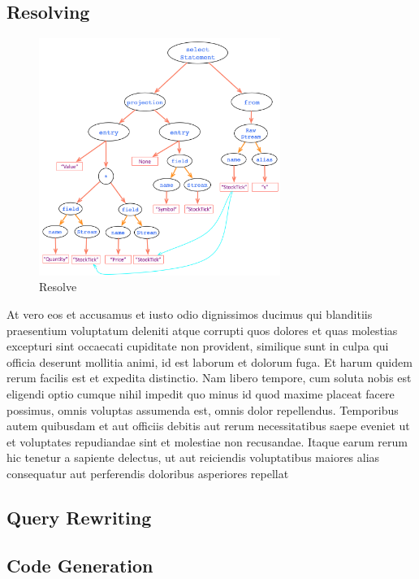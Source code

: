 \subsection{Resolving}
\begin{figure}[h!] 
\centering    
\includegraphics[width=0.7\textwidth]{Resolve}
\caption{Resolve}
\label{fig:Resolve}
\end{figure}

At vero eos et accusamus et iusto odio dignissimos ducimus qui blanditiis praesentium voluptatum deleniti atque corrupti quos dolores et quas molestias excepturi sint occaecati cupiditate non provident, similique sunt in culpa qui officia deserunt mollitia animi, id est laborum et dolorum fuga. Et harum quidem rerum facilis est et expedita distinctio. Nam libero tempore, cum soluta nobis est eligendi optio cumque nihil impedit quo minus id quod maxime placeat facere possimus, omnis voluptas assumenda est, omnis dolor repellendus. Temporibus autem quibusdam et aut officiis debitis aut rerum necessitatibus saepe eveniet ut et voluptates repudiandae sint et molestiae non recusandae. Itaque earum rerum hic tenetur a sapiente delectus, ut aut reiciendis voluptatibus maiores alias consequatur aut perferendis doloribus asperiores repellat

\subsection{Query Rewriting}
\subsection{Code Generation}


